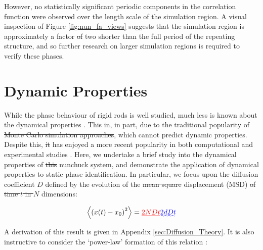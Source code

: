 \documentclass[11pt, a4paper]{article} %
\providecommand{\DIFadd}[1]{{\protect\color{blue}\uwave{#1}}} %
\providecommand{\DIFdel}[1]{{\protect\color{red}\sout{#1}}}                      %
\providecommand{\DIFaddbegin}{} %
\providecommand{\DIFaddend}{} %
\providecommand{\DIFdelbegin}{} %
\providecommand{\DIFdelend}{} %
\begin{document}
However, no statistically significant periodic components in the correlation function were observed over the length scale of the simulation region. A visual inspection of Figure \ref{fig:nun_fa_views} suggests that the simulation region is approximately a factor \DIFdelbegin \DIFdel{of }\DIFdelend two shorter than the full period of the repeating structure, and so further research on larger simulation regions is required to verify these phases.




\section{Dynamic Properties} \label{sec:Dynamics}
While the phase behaviour of rigid rods is well studied, much less is known about the dynamical properties \DIFaddbegin \DIFadd{\textcolor{forestgreen}{of the individual mesogens inside these quasi-rdered phases}}\DIFaddend . This in, in part, due to the traditional popularity of \DIFdelbegin \DIFdel{Monte Carlo simulation approaches}\DIFdelend \DIFaddbegin \DIFadd{\textcolor{forestgreen}{using MC approaches}}\DIFaddend , which cannot predict dynamic properties. Despite this, \DIFdelbegin \DIFdel{it }\DIFdelend \DIFaddbegin \DIFadd{\textcolor{forestgreen}{this MC approach} }\DIFaddend has enjoyed a more recent popularity in both computational and experimental studies \cite{GayBalmaz2013, Zhao2013, Rey2013}. Here, we undertake a brief study into the dynamical properties of \DIFdelbegin \DIFdel{this }\DIFdelend \DIFaddbegin \DIFadd{the }\DIFaddend nunchuck system, and demonstrate the application of dynamical properties to static phase identification. In particular, we focus \DIFdelbegin \DIFdel{upon }\DIFdelend \DIFaddbegin \DIFadd{on }\DIFaddend the diffusion coefficient $D$ defined by the evolution of the \DIFdelbegin \DIFdel{mean square }\DIFdelend \DIFaddbegin \DIFadd{mean-squared }\DIFaddend displacement (MSD) \DIFdelbegin \DIFdel{of time $t$ in $N$ }\DIFdelend \DIFaddbegin \DIFadd{\textcolor{forestgreen}{as function of time $t$ in $d$} }\DIFaddend dimensions:

\begin{equation} \label{eq:msd_eq} 
\left\langle \left(x(t) - x_{0}\right)^{2} \right\rangle = \DIFdelbegin \DIFdel{2NDt
}\DIFdelend \DIFaddbegin \DIFadd{2dDt
}\DIFaddend \end{equation}

A derivation of this result is given in Appendix \ref{sec:Diffusion_Theory}. It is also instructive to consider the `power-law' formation of this relation \cite{Ernst2013}: 
\end{document}
